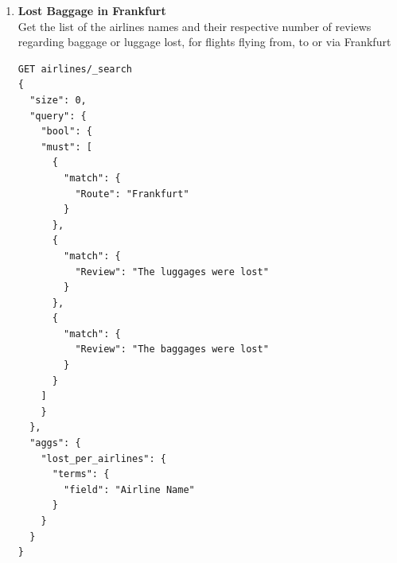 \documentclass{Configuration_Files/PoliMi3i_thesis}
\begin{document}
\begin{enumerate}
\newpage

    \item \textbf{Lost Baggage in Frankfurt} \\
    Get the list of the airlines names and their respective number of reviews regarding baggage or luggage lost, for flights flying from, to or via Frankfurt

\begin{verbatim}
GET airlines/_search
{
  "size": 0,
  "query": {
    "bool": {
    "must": [
      {
        "match": {
          "Route": "Frankfurt"
        }
      },
      {
        "match": {
          "Review": "The luggages were lost"
        }
      },
      {
        "match": {
          "Review": "The baggages were lost"
        }
      }
    ]
    }
  },
  "aggs": {
    "lost_per_airlines": {
      "terms": {
        "field": "Airline Name"
      }
    }
  }
}
\end{verbatim}
\newpage
\begin{figure}[H]
    \centering
    \\
    \subfloat{
}
\end{figure}
\end{enumerate}
\end{document}

